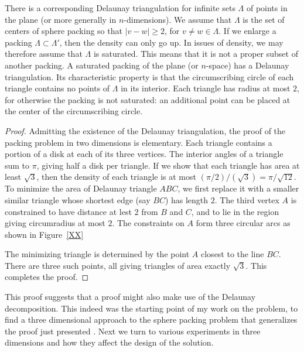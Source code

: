 There is a corresponding Delaunay triangulation for infinite sets $\Lambda$
of points in the plane (or more generally in $n$-dimensions).  We
assume that $\Lambda$ is the set of centers of sphere packing so that
$|v-w|\ge2$, for $v\ne w\in \Lambda$.  If we enlarge a packing
$\Lambda\subset\Lambda'$, then the density can only go up.  In issues
of density, we may therefore assume that $\Lambda$ is saturated.  This
means that it is not a proper subset of another packing.  A saturated
packing of the plane (or $n$-space) has a Delaunay triangulation.  Its
characteristic property is that the circumscribing circle of each triangle
contains no points of $\Lambda$ in its interior.   Each triangle has
radius at most $2$, for otherwise the packing is not saturated: an additional
point can be placed at the center of the circumscribing circle.

\begin{proof}
Admitting the existence of the Delaunay triangulation, the proof 
of the packing problem in two dimensions is
elementary.  Each triangle contains a portion of a disk at each of
its three vertices.  The interior angles of a triangle sum to $\pi$, giving
half a disk per triangle.  If we show that each triangle has area at least
$\sqrt{3}$, then the density of each triangle is at most
 $(\pi/2)/(\sqrt{3}) = \pi/\sqrt{12}$.  To minimize the area of Delaunay
triangle $ABC$, we first replace it with a smaller similar triangle whose
shortest edge (say $BC$) has length $2$.  The third vertex $A$ is constrained
to have distance at lest $2$ from $B$ and $C$, and to lie in the region
giving circumradius at most $2$.  The constraints on $A$ form three circular
arcs as shown in Figure~\ref{XX} %

The minimizing triangle is determined by the point $A$ closest to the
line $BC$.  There are three such points, all giving triangles of area
exactly $\sqrt3$.  This completes the proof.
\end{proof}

This proof suggests that a proof might also make use of the Delaunay
decomposition.  This indeed was the starting point of my work on the
problem, to find a three dimensional approach to the sphere packing
problem that generalizes the proof just presented \cite{remarks}.
Next we turn to various experiments in three dimensions and how
they affect the design of the solution.




\clearpage





